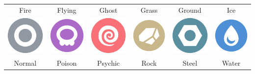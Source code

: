 \begin{table}[h]
\begin{tabular}{c c c c c c}
  Fire & Flying & Ghost & Grass & Ground & Ice \\
  \includegraphics[scale=.25]{images/normal.png} &
    \includegraphics[scale=.25]{images/poison.png} &
    \includegraphics[scale=.25]{images/psychic.png} &
    \includegraphics[scale=.25]{images/rock.png} &
    \includegraphics[scale=.25]{images/steel.png} &
    \includegraphics[scale=.25]{images/water.png} \\
  Normal & Poison & Psychic & Rock & Steel & Water \\
\end{tabular}
\end{table}
